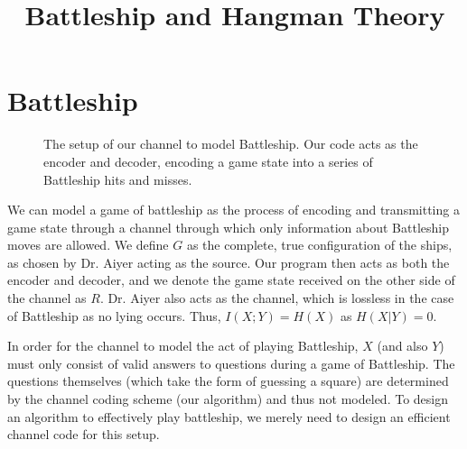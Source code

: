 \documentclass[conference,letterpaper]{IEEEtran}
\begin{document}
    \title{Battleship and Hangman Theory}
    \author{
    \IEEEauthorblockA{} \and {}}
    \maketitle
    \IEEEpeerreviewmaketitle


    \section{Battleship}

    \begin{figure}
        \centering
        \caption{The setup of our channel to model Battleship. Our code acts as the encoder and decoder, encoding a game state into a series of Battleship hits and misses.}
        \label{scheme}
    \end{figure}

    We can model a game of battleship as the process of encoding and transmitting a game state through a channel through which only information about Battleship moves are allowed. We define $G$ as the complete, true configuration of the ships, as chosen by Dr. Aiyer acting as the source. Our program then acts as both the encoder and decoder, and we denote the game state received on the other side of the channel as $R$. Dr. Aiyer also acts as the channel, which is lossless in the case of Battleship as no lying occurs. Thus, $I(X;Y) = H(X)$ as $H(X|Y) = 0$. 
    
    In order for the channel to model the act of playing Battleship, $X$ (and also $Y$) must only consist of valid answers to questions during a game of Battleship. The questions themselves (which take the form of guessing a square) are determined by the channel coding scheme (our algorithm) and thus not modeled. To design an algorithm to effectively play battleship, we merely need to design an efficient channel code for this setup. 
    
\end{document}
